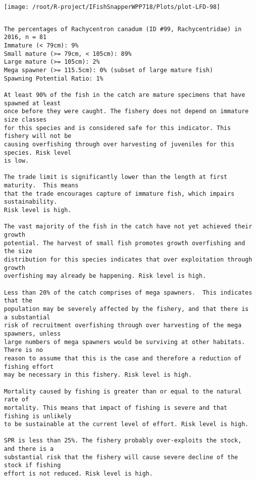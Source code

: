 \documentclass{report}\usepackage[]{graphicx}\usepackage[]{color}
\makeatletter
\def\maxwidth{ %
  \ifdim\Gin@nat@width>\linewidth
    \linewidth
  \else
    \Gin@nat@width
  \fi
}
\newenvironment{kframe}{%
 \def\at@end@of@kframe{}%
 \ifinner\ifhmode%
  \def\at@end@of@kframe{\end{minipage}}%
  \begin{minipage}{\columnwidth}%
 \fi\fi%
 \def\FrameCommand##1{\hskip\@totalleftmargin \hskip-\fboxsep
 \colorbox{shadecolor}{##1}\hskip-\fboxsep
     \hskip-\linewidth \hskip-\@totalleftmargin \hskip\columnwidth}%
 \MakeFramed {\advance\hsize-\width
   \@totalleftmargin\z@ \linewidth\hsize
   \@setminipage}}%
 {\par\unskip\endMakeFramed%
 \at@end@of@kframe}
\newenvironment{knitrout}{}{} %
\makeatother
\begin{document}
\begin{knitrout}
\texttt{[image: /root/R-project/IFishSnapperWPP718/Plots/plot-LFD-98]} 
\begin{kframe}\begin{verbatim}
\end{verbatim}
\end{kframe}
\clearpage
\newpage
\begin{kframe}\begin{verbatim}The percentages of Rachycentron canadum (ID #99, Rachycentridae) in 2016, n = 81
Immature (< 79cm): 9%
Small mature (>= 79cm, < 105cm): 89%
Large mature (>= 105cm): 2%
Mega spawner (>= 115.5cm): 0% (subset of large mature fish)
Spawning Potential Ratio: 1%
 
At least 90% of the fish in the catch are mature specimens that have spawned at least
once before they were caught. The fishery does not depend on immature size classes
for this species and is considered safe for this indicator. This fishery will not be
causing overfishing through over harvesting of juveniles for this species. Risk level
is low.

The trade limit is significantly lower than the length at first maturity.  This means
that the trade encourages capture of immature fish, which impairs sustainability.
Risk level is high.

The vast majority of the fish in the catch have not yet achieved their growth
potential. The harvest of small fish promotes growth overfishing and the size
distribution for this species indicates that over exploitation through growth
overfishing may already be happening. Risk level is high.

Less than 20% of the catch comprises of mega spawners.  This indicates that the
population may be severely affected by the fishery, and that there is a substantial
risk of recruitment overfishing through over harvesting of the mega spawners, unless
large numbers of mega spawners would be surviving at other habitats. There is no
reason to assume that this is the case and therefore a reduction of fishing effort
may be necessary in this fishery. Risk level is high.
 
Mortality caused by fishing is greater than or equal to the natural rate of
mortality. This means that impact of fishing is severe and that fishing is unlikely
to be sustainable at the current level of effort. Risk level is high.
 
SPR is less than 25%. The fishery probably over-exploits the stock, and there is a
substantial risk that the fishery will cause severe decline of the stock if fishing
effort is not reduced. Risk level is high.
 

\end{verbatim}
\end{kframe}
\end{knitrout}
\end{document}
